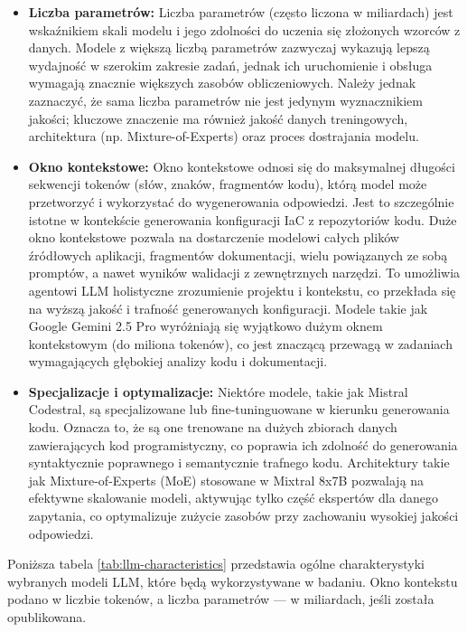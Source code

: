 \begin{itemize}
	\item \textbf{Liczba parametrów:} Liczba parametrów (często liczona w miliardach) jest wskaźnikiem skali modelu i jego zdolności do uczenia się złożonych wzorców z danych. Modele z większą liczbą parametrów zazwyczaj wykazują lepszą wydajność w szerokim zakresie zadań, jednak ich uruchomienie i obsługa wymagają znacznie większych zasobów obliczeniowych. Należy jednak zaznaczyć, że sama liczba parametrów nie jest jedynym wyznacznikiem jakości; kluczowe znaczenie ma również jakość danych treningowych, architektura (np. Mixture-of-Experts) oraz proces dostrajania modelu.
	\item \textbf{Okno kontekstowe:} Okno kontekstowe odnosi się do maksymalnej długości sekwencji tokenów (słów, znaków, fragmentów kodu), którą model może przetworzyć i wykorzystać do wygenerowania odpowiedzi. Jest to szczególnie istotne w kontekście generowania konfiguracji IaC z repozytoriów kodu. Duże okno kontekstowe pozwala na dostarczenie modelowi całych plików źródłowych aplikacji, fragmentów dokumentacji, wielu powiązanych ze sobą promptów, a nawet wyników walidacji z zewnętrznych narzędzi. To umożliwia agentowi LLM holistyczne zrozumienie projektu i kontekstu, co przekłada się na wyższą jakość i trafność generowanych konfiguracji. Modele takie jak Google Gemini 2.5 Pro wyróżniają się wyjątkowo dużym oknem kontekstowym (do miliona tokenów), co jest znaczącą przewagą w zadaniach wymagających głębokiej analizy kodu i dokumentacji.
	\item \textbf{Specjalizacje i optymalizacje:} Niektóre modele, takie jak Mistral Codestral, są specjalizowane lub fine-tuninguowane w kierunku generowania kodu. Oznacza to, że są one trenowane na dużych zbiorach danych zawierających kod programistyczny, co poprawia ich zdolność do generowania syntaktycznie poprawnego i semantycznie trafnego kodu. Architektury takie jak Mixture-of-Experts (MoE) stosowane w Mixtral 8x7B pozwalają na efektywne skalowanie modeli, aktywując tylko część ekspertów dla danego zapytania, co optymalizuje zużycie zasobów przy zachowaniu wysokiej jakości odpowiedzi.
\end{itemize}

Poniższa tabela \ref{tab:llm-characteristics} przedstawia ogólne charakterystyki wybranych modeli LLM, które będą wykorzystywane w badaniu. Okno kontekstu podano w liczbie tokenów, a liczba parametrów — w miliardach, jeśli została opublikowana.

